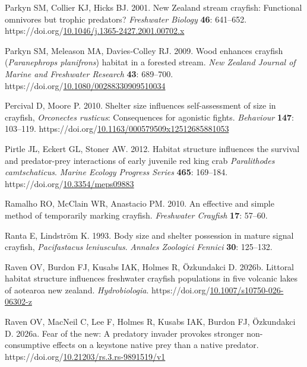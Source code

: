 \documentclass[
  letterpaper,
  DIV=11,
  numbers=noendperiod]{scrartcl}
\newlength{\cslhangindent}
\newenvironment{CSLReferences}[2] %
 {\begin{list}{}{%
  \setlength{\itemindent}{0pt}
  \setlength{\leftmargin}{0pt}
  \setlength{\parsep}{0pt}
  \ifodd #1
   \setlength{\leftmargin}{\cslhangindent}
   \setlength{\itemindent}{-1\cslhangindent}
  \fi
  \setlength{\itemsep}{#2\baselineskip}}}
 {\end{list}}
\begin{document}
\begin{CSLReferences}{1}{0}
Parkyn SM, Collier KJ, Hicks BJ. 2001. {New Zealand} stream crayfish:
Functional omnivores but trophic predators? \emph{Freshwater Biology}
\textbf{46}: 641--652.
https://doi.org/\href{https://doi.org/10.1046/j.1365-2427.2001.00702.x}{10.1046/j.1365-2427.2001.00702.x}

Parkyn SM, Meleason MA, Davies‐Colley RJ. 2009. Wood enhances crayfish
({\emph{Paranephrops planifrons}}) habitat in a forested stream.
\emph{New Zealand Journal of Marine and Freshwater Research}
\textbf{43}: 689--700.
https://doi.org/\href{https://doi.org/10.1080/00288330909510034}{10.1080/00288330909510034}

Percival D, Moore P. 2010. Shelter size influences self-assessment of
size in crayfish, {\emph{Orconectes rusticus}}: Consequences for
agonistic fights. \emph{Behaviour} \textbf{147}: 103--119.
https://doi.org/\href{https://doi.org/10.1163/000579509x12512685881053}{10.1163/000579509x12512685881053}

Pirtle JL, Eckert GL, Stoner AW. 2012. Habitat structure influences the
survival and predator-prey interactions of early juvenile red king crab
{\emph{Paralithodes camtschaticus}}. \emph{Marine Ecology Progress
Series} \textbf{465}: 169--184.
https://doi.org/\href{https://doi.org/10.3354/meps09883}{10.3354/meps09883}

Ramalho RO, McClain WR, Anastacio PM. 2010. An effective and simple
method of temporarily marking crayfish. \emph{Freshwater Crayfish}
\textbf{17}: 57--60.

Ranta E, Lindström K. 1993. Body size and shelter possession in mature
signal crayfish, {\emph{Pacifastacus leniusculus}}. \emph{Annales
Zoologici Fennici} \textbf{30}: 125--132.

Raven OV, Burdon FJ, Kusabs IAK, Holmes R, Özkundakci D. 2026b. Littoral
habitat structure influences freshwater crayfish populations in five
volcanic lakes of aotearoa new zealand. \emph{Hydrobiologia}.
https://doi.org/\href{https://doi.org/10.1007/s10750-026-06302-z}{10.1007/s10750-026-06302-z}

Raven OV, MacNeil C, Lee F, Holmes R, Kusabs IAK, Burdon FJ, Özkundakci
D. 2026a. Fear of the new: A predatory invader provokes stronger
non-consumptive effects on a keystone native prey than a native
predator.
https://doi.org/\href{https://doi.org/10.21203/rs.3.rs-9891519/v1}{10.21203/rs.3.rs-9891519/v1}


\end{CSLReferences}
\end{document}
